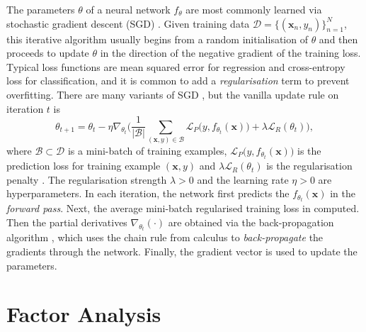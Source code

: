 \documentclass[msc,deptreport.inf]{infthesis} %
\newcommand{\matr}[1]{\mathbf{#1}}
\begin{document}
The parameters $\theta$ of a neural network $f_\theta$ are most commonly learned via stochastic gradient descent (SGD) \cite{goodfellow2016}. Given training data $\mathcal{D} = \{(\matr{x}_n, y_n)\}_{n=1}^{N}$, this iterative algorithm usually begins from a random initialisation of $\theta$ and then proceeds to update $\theta$ in the direction of the negative gradient of the training loss. Typical loss functions are mean squared error for regression and cross-entropy loss for classification, and it is common to add a \emph{regularisation} term to prevent overfitting. There are many variants of SGD \cite{ruder2016}, but the vanilla update rule on iteration $t$ is 
\begin{equation}\label{eqn:sgd}
	\theta_{t+1} = \theta_t - \eta \nabla_{\theta_t} \Bigg( \frac{1}{|\mathcal{B}|} \sum_{(\matr{x}, y) \in \mathcal{B}} \mathcal{L}_P \big(y, f_{\theta_t}(\matr{x})\big) + \lambda \mathcal{L}_R (\theta_t) \Bigg),
\end{equation}
where $\mathcal{B} \subset \mathcal{D}$ is a mini-batch of training examples, $\mathcal{L}_P \big(y, f_{\theta_t}(\matr{x})\big)$ is the prediction loss for training example $(\matr{x}, y)$ and $\lambda \mathcal{L}_R (\theta_t)$ is the regularisation penalty \cite{brownlie2021}. The regularisation strength $\lambda > 0$ and the learning rate $\eta > 0$ are hyperparameters. In each iteration, the network first predicts the $f_{\theta_t}(\matr{x})$ in the \emph{forward pass}. Next, the average mini-batch regularised training loss in computed. Then the partial derivatives $\nabla_{\theta_t}(\cdot)$ are obtained via the back-propagation algorithm \cite{rumelhart1986}, which uses the chain rule from calculus to \emph{back-propagate} the gradients through the network. Finally, the gradient vector is used to update the parameters. 


\section{Factor Analysis}\label{sec:fa}
\end{document}
